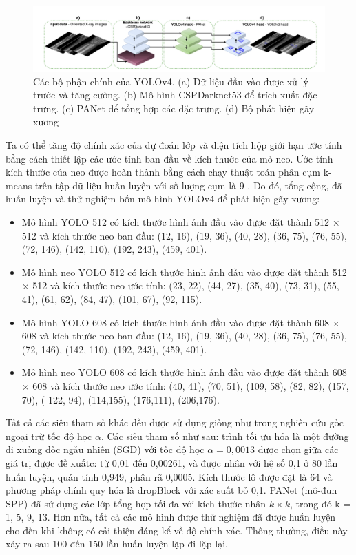 \documentclass[../the.tex]{subfiles}
\begin{document}
\begin{figure}[ht!]
\centering
	\includegraphics[width=1\textwidth]{images/yolov4_pro.png}
	\caption{Các bộ phận chính của YOLOv4. (a) Dữ liệu đầu vào được xử lý trước và tăng cường. (b) Mô hình CSPDarknet53 để trích xuất đặc trưng. (c) PANet để tổng hợp các đặc trưng. (d) Bộ phát hiện gãy xương}
	\label{fig:yolov4_pro}
\end{figure}

{\fontsize{13}{12} \selectfont
Ta có thể tăng độ chính xác của dự đoán lớp và diện tích hộp giới hạn ước tính bằng cách thiết lập các ước tính ban đầu về kích thước của mỏ neo. Ước tính kích thước của neo được hoàn thành bằng cách chạy thuật toán phân cụm k-means trên tập dữ liệu huấn luyện với số lượng cụm là 9 \cite{Likas2003}. Do đó, tổng cộng, đã huấn luyện và thử nghiệm bốn mô hình YOLOv4 để phát hiện gãy xương:

\begin{itemize}
  \item Mô hình YOLO 512 có kích thước hình ảnh đầu vào được đặt thành 512 × 512 và kích thước neo ban đầu: (12, 16), (19, 36), (40, 28), (36, 75), (76, 55), (72, 146), (142, 110), (192, 243), (459, 401).

  \item Mô hình neo YOLO 512 có kích thước hình ảnh đầu vào được đặt thành 512 × 512 và kích thước neo ước tính: (23, 22), (44, 27), (35, 40), (73, 31), (55, 41), (61, 62), (84, 47), (101, 67), (92, 115).
   
  \item Mô hình YOLO 608 có kích thước hình ảnh đầu vào được đặt thành 608 × 608 và kích thước neo ban đầu: (12, 16), (19, 36), (40, 28), (36, 75), (76, 55), (72, 146), (142, 110), (192, 243), (459, 401).
  
  \item Mô hình neo YOLO 608 có kích thước hình ảnh đầu vào được đặt thành 608 × 608 và kích thước neo ước tính: (40, 41), (70, 51), (109, 58), (82, 82), (157, 70), ( 122, 94), (114,155), (176,111), (206,176).
\end{itemize}

Tất cả các siêu tham số khác đều được sử dụng giống như trong nghiên cứu gốc ngoại trừ tốc độ học $\alpha$. Các siêu tham số như sau: trình tối ưu hóa là một đường đi xuống dốc ngẫu nhiên (SGD) với tốc độ học $\alpha = 0,0013$ được chọn giữa các giá trị được đề xuấtc: từ 0,01 đến 0,00261, và được nhân với hệ số 0,1 ở 80 lần huấn luyện, quán tính 0,949, phân rã 0,0005. Kích thước lô được đặt là 64 và phương pháp chính quy hóa là dropBlock với xác suất bỏ 0,1. PANet (mô-đun SPP) đã sử dụng các lớp tổng hợp tối đa với kích thước nhân $k \times k$, trong đó k = 1, 5, 9, 13. Hơn nữa, tất cả các mô hình được thử nghiệm đã được huấn luyện cho đến khi không có cải thiện đáng kể về độ chính xác. Thông thường, điều này xảy ra sau 100 đến 150 lần huấn luyện lặp đi lặp lại.
}
\end{document}
